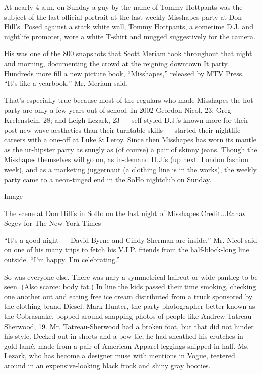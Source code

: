 At nearly 4 a.m. on Sunday a guy by the name of Tommy Hottpants was the
subject of the last official portrait at the last weekly Misshapes party
at Don Hill's. Posed against a stark white wall, Tommy Hottpants, a
sometime D.J. and nightlife promoter, wore a white T-shirt and mugged
suggestively for the camera.

His was one of the 800 snapshots that Scott Meriam took throughout that
night and morning, documenting the crowd at the reigning downtown It
party. Hundreds more fill a new picture book, ``Misshapes,'' released by
MTV Press. ``It's like a yearbook,'' Mr. Meriam said.

That's especially true because most of the regulars who made Misshapes
the hot party are only a few years out of school. In 2002 Geordon Nicol,
23; Greg Krelenstein, 28; and Leigh Lezark, 23 --- self-styled D.J.'s
known more for their post-new-wave aesthetics than their turntable
skills --- started their nightlife careers with a one-off at Luke \&
Leroy. Since then Misshapes has worn its mantle as the ur-hipster party
as snugly as (of course) a pair of skinny jeans. Though the Misshapes
themselves will go on, as in-demand D.J.'s (up next: London fashion
week), and as a marketing juggernaut (a clothing line is in the works),
the weekly party came to a neon-tinged end in the SoHo nightclub on
Sunday.

Image

The scene at Don Hill's in SoHo on the last night of
Misshapes.Credit...Rahav Segev for The New York Times

``It's a good night --- David Byrne and Cindy Sherman are inside,'' Mr.
Nicol said on one of his many trips to fetch his V.I.P. friends from the
half-block-long line outside. ``I'm happy. I'm celebrating.''

So was everyone else. There was nary a symmetrical haircut or wide
pantleg to be seen. (Also scarce: body fat.) In line the kids passed
their time smoking, checking one another out and eating free ice cream
distributed from a truck sponsored by the clothing brand Diesel. Mark
Hunter, the party photographer better known as the Cobrasnake, bopped
around snapping photos of people like Andrew Tatreau-Sherwood, 19. Mr.
Tatreau-Sherwood had a broken foot, but that did not hinder his style.
Decked out in shorts and a bow tie, he had sheathed his crutches in gold
lamé, made from a pair of American Apparel leggings snipped in half. Ms.
Lezark, who has become a designer muse with mentions in Vogue, teetered
around in an expensive-looking black frock and shiny gray booties.

